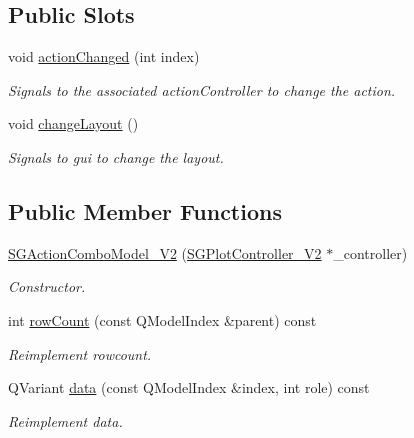 \subsection*{Public Slots}
\begin{DoxyCompactItemize}
\item 
\mbox{\label{classSGActionComboModel__V2_ad72d58c73cce1e08a710381ee991c7de}} 
void \hyperlink{classSGActionComboModel__V2_ad72d58c73cce1e08a710381ee991c7de}{action\+Changed} (int index)
\begin{DoxyCompactList}\small\item\em Signals to the associated action\+Controller to change the action. \end{DoxyCompactList}\item 
\mbox{\label{classSGActionComboModel__V2_addfa2b818a357e947e018457d05af158}} 
void \hyperlink{classSGActionComboModel__V2_addfa2b818a357e947e018457d05af158}{change\+Layout} ()
\begin{DoxyCompactList}\small\item\em Signals to gui to change the layout. \end{DoxyCompactList}\end{DoxyCompactItemize}
\subsection*{Public Member Functions}
\begin{DoxyCompactItemize}
\item 
\mbox{\label{classSGActionComboModel__V2_a4a6580cf7659a55e7e4e708d288bf87a}} 
\hyperlink{classSGActionComboModel__V2_a4a6580cf7659a55e7e4e708d288bf87a}{S\+G\+Action\+Combo\+Model\+\_\+\+V2} (\hyperlink{classSGPlotController__V2}{S\+G\+Plot\+Controller\+\_\+\+V2} $\ast$\+\_\+controller)
\begin{DoxyCompactList}\small\item\em Constructor. \end{DoxyCompactList}\item 
\mbox{\label{classSGActionComboModel__V2_a4a46e78980cca2f225a9785496e5d3a2}} 
int \hyperlink{classSGActionComboModel__V2_a4a46e78980cca2f225a9785496e5d3a2}{row\+Count} (const Q\+Model\+Index \&parent) const
\begin{DoxyCompactList}\small\item\em Reimplement rowcount. \end{DoxyCompactList}\item 
\mbox{\label{classSGActionComboModel__V2_aeb624631b3be8b357a53abc6244ce761}} 
Q\+Variant \hyperlink{classSGActionComboModel__V2_aeb624631b3be8b357a53abc6244ce761}{data} (const Q\+Model\+Index \&index, int role) const
\begin{DoxyCompactList}\small\item\em Reimplement data. \end{DoxyCompactList}\end{DoxyCompactItemize}
